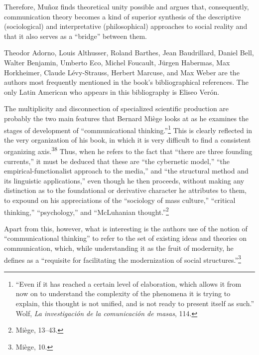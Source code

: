 \documentclass{tufte-handout}
\begin{document}
Therefore, Muñoz finds theoretical unity possible and argues that,
consequently, communication theory becomes a kind of superior synthesis
of the descriptive (sociological) and interpretative (philosophical)
approaches to social reality and that it also serves as a ``bridge''
between them.

Theodor Adorno, Louis Althusser, Roland Barthes, Jean Baudrillard,
Daniel Bell, Walter Benjamin, Umberto Eco, Michel Foucault, Jürgen
Habermas, Max Horkheimer, Claude Lévy-Strauss, Herbert Marcuse, and Max
Weber are the authors most frequently mentioned in the book's
bibliographical references. The only Latin American who appears in this
bibliography is Eliseo Verón.

The multiplicity and disconnection of specialized scientific production
are probably the two main features that Bernard Miège looks at as he
examines the stages of development of ``communicational
thinking.''\footnote{``Even if it has reached a certain level of
  elaboration, which allows it from now on to understand the complexity
  of the phenomena it is trying to explain, this thought is not unified,
  and is not ready to present itself as such.'' Wolf, \emph{La
  investigación de la comunicación de masas}, 114.} This is clearly
reflected in the very organization of his book, in which it is very
difficult to find a consistent organizing axis.\textsuperscript{38} Thus, when he refers to the fact that ``there are three
founding currents,'' it must be deduced that these are ``the cybernetic
model,'' ``the empirical-functionalist approach to the media,'' and
``the structural method and its linguistic applications,'' even though
he then proceeds, without making any distinction as to the foundational
or derivative character he attributes to them, to expound on his
appreciations of the ``sociology of mass culture,'' ``critical
thinking,'' ``psychology,'' and ``McLuhanian thought.''\footnote{Miège,
  13--43.}

Apart from this, however, what is interesting is the
author\textquotesingle s use of the notion of ``communicational
thinking'' to refer to the set of existing ideas and theories on
communication, which, while understanding it as the fruit of modernity,
he defines as a ``requisite for facilitating the modernization of social
structures.''\footnote{Miège, 10.}
\end{document}
